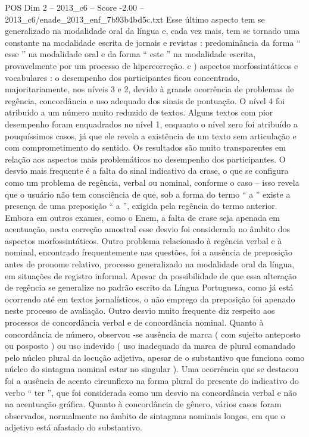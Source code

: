 \begin{textsample}{POS Dim 2 – 2013\_c6 – Score -2.00 – 2013\_c6/enade\_2013\_enf\_7b93b4bd5c.txt}
Esse último aspecto tem se generalizado na modalidade oral da língua e, cada vez mais, tem se tornado uma constante na modalidade escrita de jornais e revistas : predominância da forma “ esse ” na modalidade oral e da forma “ este ” na modalidade escrita, provavelmente por um processo de hipercorreção. c ) aspectos morfossintáticos e vocabulares : o desempenho dos participantes ficou concentrado, majoritariamente, nos níveis 3 e 2, devido à grande ocorrência de problemas de regência, concordância e uso adequado dos sinais de pontuação.
O nível 4 foi atribuído a um número muito reduzido de textos.
Alguns textos com pior desempenho foram enquadrados no nível 1, enquanto o nível zero foi atribuído a pouquíssimos casos, já que ele revela a existência de um texto sem articulação e com comprometimento do sentido.
Os resultados são muito transparentes em relação aos aspectos mais problemáticos no desempenho dos participantes.
O desvio mais frequente é a falta do sinal indicativo da crase, o que se configura como um problema de regência, verbal ou nominal, conforme o caso – isso revela que o usuário não tem consciência de que, sob a forma do termo “ a ” existe a presença de uma preposição “ a ”, exigida pela regência do termo anterior.
Embora em outros exames, como o Enem, a falta de crase seja apenada em acentuação, nesta correção amostral esse desvio foi considerado no âmbito dos aspectos morfossintáticos.
Outro problema relacionado à regência verbal e à nominal, encontrado frequentemente nas questões, foi a ausência de preposição antes de pronome relativo, processo generalizado na modalidade oral da língua, em situações de registro informal.
Apesar da possibilidade de que essa alteração de regência se generalize no padrão escrito da Língua Portuguesa, como já está ocorrendo até em textos jornalísticos, o não emprego da preposição foi apenado neste processo de avaliação.
Outro desvio muito frequente diz respeito aos processos de concordância verbal e de concordância nominal.
Quanto à concordância de número, observou -se ausência de marca ( com sujeito anteposto ou posposto ) ou uso indevido ( uso inadequado da marca de plural comandado pelo núcleo plural da locução adjetiva, apesar de o substantivo que funciona como núcleo do sintagma nominal estar no singular ).
Uma ocorrência que se destacou foi a ausência de acento circunflexo na forma plural do presente do indicativo do verbo “ ter ”, que foi considerada como um desvio na concordância verbal e não na acentuação gráfica.
Quanto à concordância de gênero, vários casos foram observados, normalmente no âmbito de sintagmas nominais longos, em que o adjetivo está afastado do substantivo.

\end{textsample}
